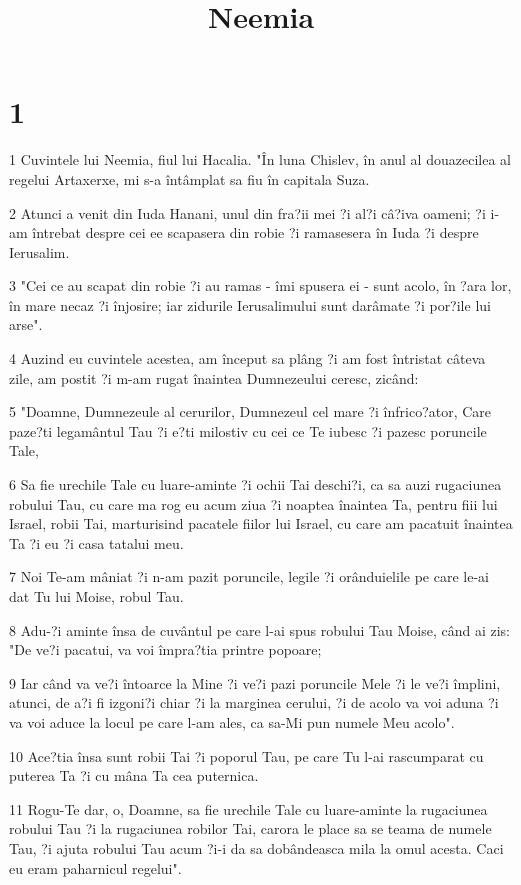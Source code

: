 

\title{Neemia}


\chapter{1}

\par 1 Cuvintele lui Neemia, fiul lui Hacalia. "În luna Chislev, în anul al douazecilea al regelui Artaxerxe, mi s-a întâmplat sa fiu în capitala Suza.
\par 2 Atunci a venit din Iuda Hanani, unul din fra?ii mei ?i al?i câ?iva oameni; ?i i-am întrebat despre cei ee scapasera din robie ?i ramasesera în Iuda ?i despre Ierusalim.
\par 3 "Cei ce au scapat din robie ?i au ramas - îmi spusera ei - sunt acolo, în ?ara lor, în mare necaz ?i înjosire; iar zidurile Ierusalimului sunt darâmate ?i por?ile lui arse".
\par 4 Auzind eu cuvintele acestea, am început sa plâng ?i am fost întristat câteva zile, am postit ?i m-am rugat înaintea Dumnezeului ceresc, zicând:
\par 5 "Doamne, Dumnezeule al cerurilor, Dumnezeul cel mare ?i înfrico?ator, Care paze?ti legamântul Tau ?i e?ti milostiv cu cei ce Te iubesc ?i pazesc poruncile Tale,
\par 6 Sa fie urechile Tale cu luare-aminte ?i ochii Tai deschi?i, ca sa auzi rugaciunea robului Tau, cu care ma rog eu acum ziua ?i noaptea înaintea Ta, pentru fiii lui Israel, robii Tai, marturisind pacatele fiilor lui Israel, cu care am pacatuit înaintea Ta ?i eu ?i casa tatalui meu.
\par 7 Noi Te-am mâniat ?i n-am pazit poruncile, legile ?i orânduielile pe care le-ai dat Tu lui Moise, robul Tau.
\par 8 Adu-?i aminte însa de cuvântul pe care l-ai spus robului Tau Moise, când ai zis: "De ve?i pacatui, va voi împra?tia printre popoare;
\par 9 Iar când va ve?i întoarce la Mine ?i ve?i pazi poruncile Mele ?i le ve?i împlini, atunci, de a?i fi izgoni?i chiar ?i la marginea cerului, ?i de acolo va voi aduna ?i va voi aduce la locul pe care l-am ales, ca sa-Mi pun numele Meu acolo".
\par 10 Ace?tia însa sunt robii Tai ?i poporul Tau, pe care Tu l-ai rascumparat cu puterea Ta ?i cu mâna Ta cea puternica.
\par 11 Rogu-Te dar, o, Doamne, sa fie urechile Tale cu luare-aminte la rugaciunea robului Tau ?i la rugaciunea robilor Tai, carora le place sa se teama de numele Tau, ?i ajuta robului Tau acum ?i-i da sa dobândeasca mila la omul acesta. Caci eu eram paharnicul regelui".

